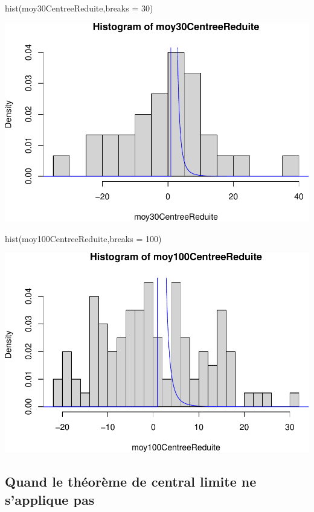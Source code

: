 \documentclass[
]{article}
\newenvironment{Shaded}{\begin{snugshade}}{\end{snugshade}}
\newcommand{\AttributeTok}[1]{\textcolor[rgb]{0.77,0.63,0.00}{#1}}
\newcommand{\DecValTok}[1]{\textcolor[rgb]{0.00,0.00,0.81}{#1}}
\newcommand{\FunctionTok}[1]{\textcolor[rgb]{0.00,0.00,0.00}{#1}}
\newcommand{\NormalTok}[1]{#1}
\begin{document}
\begin{Shaded}
\begin{Highlighting}[]
\FunctionTok{hist}\NormalTok{(moy30CentreeReduite,}\AttributeTok{breaks =} \DecValTok{30}\NormalTok{)}
\end{Highlighting}
\end{Shaded}

\includegraphics{tp2_files/figure-latex/normalisation-2.pdf}

\begin{Shaded}
\begin{Highlighting}[]
\FunctionTok{hist}\NormalTok{(moy100CentreeReduite,}\AttributeTok{breaks =} \DecValTok{100}\NormalTok{)}
\end{Highlighting}
\end{Shaded}

\includegraphics{tp2_files/figure-latex/normalisation-3.pdf}

\hypertarget{quand-le-thuxe9oruxe8me-de-central-limite-ne-sapplique-pas}{%
\subsection{Quand le théorème de central limite ne s'applique
pas}\label{quand-le-thuxe9oruxe8me-de-central-limite-ne-sapplique-pas}}
\end{document}
